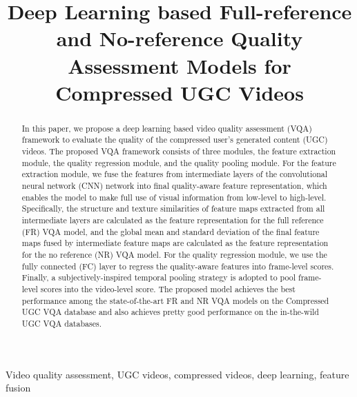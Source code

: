 \documentclass{article}
\begin{document}
\sloppy



\def\x{{\mathbf x}}
\def\L{{\cal L}}


\title{Deep Learning based Full-reference and No-reference Quality Assessment Models for Compressed UGC Videos}
\address{Institue of Image Communication and Information Processing, Shanghai Jiao Tong University, China \\
Email: sunguwei@sjtu.edu.cn}


\maketitle


\begin{abstract}
In this paper, we propose a deep learning based video quality assessment (VQA) framework to evaluate the quality of the compressed user's generated content (UGC) videos. The proposed VQA framework consists of three modules, the feature extraction module, the quality regression module, and the quality pooling module. For the feature extraction module, we fuse the features from intermediate layers of the convolutional neural network (CNN) network into final quality-aware feature representation, which enables the model to make full use of visual information from low-level to high-level. Specifically, the structure and texture similarities of feature maps extracted from all intermediate layers are calculated as the feature representation for the full reference (FR) VQA model, and the global mean and standard deviation of the final feature maps fused by intermediate feature maps are calculated as the feature representation for the no reference (NR) VQA model. For the quality regression module, we use the fully connected (FC) layer to regress the quality-aware features into frame-level scores. Finally, a subjectively-inspired temporal pooling strategy is adopted to pool frame-level scores into the video-level score. The proposed model achieves the best performance among the state-of-the-art FR and NR VQA models on the Compressed UGC VQA database and also achieves pretty good performance on the in-the-wild UGC VQA databases.
\end{abstract}
\begin{keywords}
Video quality assessment, UGC videos, compressed videos, deep learning, feature fusion
\end{keywords}
\end{document}
